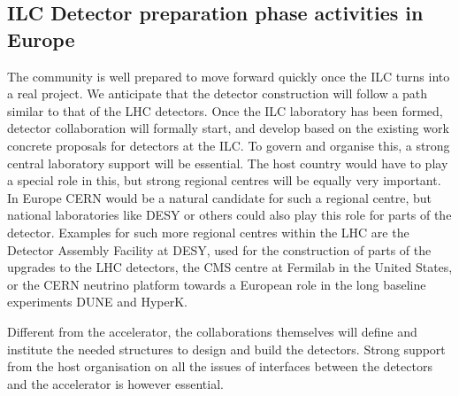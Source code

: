 \documentclass[%
 reprint,
 amsmath,amssymb,
 aps,
]{revtex4-1}
\begin{document}
\subsection{ILC Detector preparation phase activities in Europe~\label{sec:prepphase:detectors}}
The community is well prepared to move forward quickly once the ILC turns into a 
real project. We anticipate that the detector construction will follow a path 
similar to that of the LHC detectors. Once the ILC laboratory has been formed, 
detector collaboration will formally start, and develop based on the existing 
work concrete proposals for detectors at the ILC. To govern and organise this, a 
strong central laboratory support will be essential. The host country would have 
to play a special role in this, but strong regional centres will be equally very 
important. In Europe CERN would be a natural candidate for such a regional 
centre, but national laboratories like DESY or others could also play this role 
for parts of the detector. Examples for such more regional centres within the 
LHC are the Detector Assembly Facility at DESY, used for the construction of 
parts of the upgrades to the LHC detectors, the CMS centre at Fermilab in the 
United States, or the CERN neutrino platform towards a European role in the long 
baseline experiments DUNE and HyperK. 

Different from the accelerator, the collaborations themselves will define and institute 
the needed structures to design and build the detectors. Strong support from the host 
organisation on all the issues of interfaces between the detectors and the accelerator is however essential. 
\end{document}
